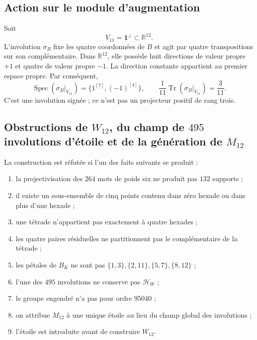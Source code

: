 \subsection{Action sur le module d'augmentation}

Soit
\[
 V_{11}=\mathbf1^\perp\subset\mathbb R^{12}.
\]
L'involution \(\sigma_B\) fixe les quatre coordonnées de \(B\) et agit
par quatre transpositions sur son complémentaire. Dans \(\mathbb R^{12}\),
elle possède huit directions de valeur propre \(+1\) et quatre de valeur propre \(-1\).
La direction constante appartient au premier espace propre. Par conséquent,
\begin{equation}
 \operatorname{Spec}(\sigma_B|_{V_{11}})
 =\{1^{[7]},(-1)^{[4]}\},
 \qquad
 \frac1{11}\operatorname{Tr}(\sigma_B|_{V_{11}})=\frac3{11}.
 \label{p12-83-c20-s2:eq:espectro-involucion-estrella-aumentacion}
\end{equation}
C'est une involution signée ; ce n'est pas un projecteur positif de rang trois.

\subsection{Obstructions de \(W_{12}\), du champ de \(495\) involutions d'étoile et de la génération de \(M_{12}\)}

\begin{criterion}
La construction est réfutée si l'un des faits
suivants se produit :
\begin{enumerate}
 \item la projectivisation des \(264\) mots de poids six ne produit pas
       \(132\) supports ;
 \item il existe un sous-ensemble de cinq points contenu dans zéro hexade ou dans plus
       d'une hexade ;
 \item une tétrade n'appartient pas exactement à quatre hexades ;
 \item les quatre paires résiduelles ne partitionnent pas le complémentaire de la
       tétrade ;
 \item les pétales de \(B_K\) ne sont pas
       \(\{1,3\},\{2,11\},\{5,7\},\{8,12\}\) ;
 \item l'une des \(495\) involutions ne conserve pas
       \(\mathcal H_W\) ;
 \item le groupe engendré n'a pas pour ordre \(95040\) ;
 \item on attribue \(M_{12}\) à une unique étoile au lieu du champ
       global des involutions ;
 \item l'étoile est introduite avant de construire \(W_{12}\).
\end{enumerate}
\end{criterion}


